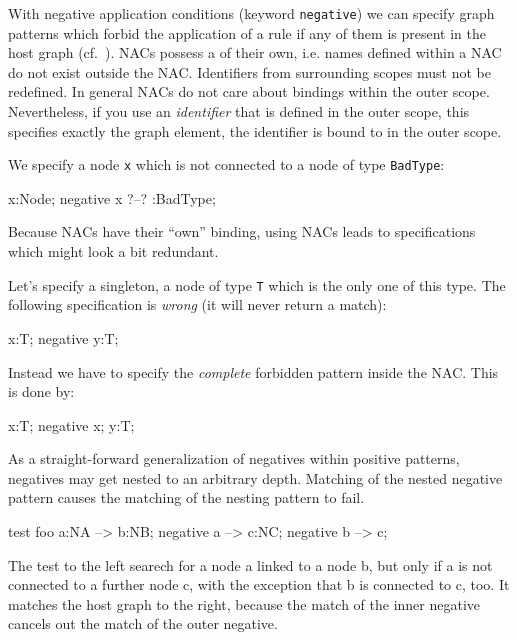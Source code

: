   With negative application conditions (keyword \texttt{negative}) we can specify graph patterns which forbid the application of a rule if any of them is present in the host graph (cf.~\cite{adam}). 
  NACs possess a  of their own, i.e. names defined within a NAC do not exist outside the NAC. 
  Identifiers from surrounding scopes must not be redefined.
  In general NACs do not care about bindings within the outer scope. 
   Nevertheless, if you use an \emph{identifier} that is defined in the outer scope, this specifies exactly the graph element, the identifier is bound to in the outer scope.
  \begin{example}
    We specify a node \texttt{x} which is not connected to a node of type \texttt{BadType}:
    \begin{grgen}
  x:Node;
  negative {
    x ?--? :BadType;
  }
    \end{grgen}
  \end{example}
   Because NACs have their ``own'' binding, using NACs leads to specifications which might look a bit redundant.
  \begin{example}
    Let's specify a singleton, a node of type \texttt{T} which is the only one of this type.
    The following specification is \emph{wrong} (it will never return a match):
    \begin{grgen}
  x:T;
  negative {
    y:T;
  }
    \end{grgen}
    Instead we have to specify the \emph{complete} forbidden pattern inside the NAC. This is done by:
     \begin{grgen}
  x:T;
  negative {
    x;
    y:T;
  }
    \end{grgen}
  \end{example} 

As a straight-forward generalization of negatives within positive patterns,
negatives may get nested to an arbitrary depth. Matching of the nested
negative pattern causes the matching of the nesting pattern to fail.

\begin{example}
  \begin{grgen}
test foo {
  a:NA --> b:NB;
  negative {
    a --> c:NC;
    negative {
      b --> c;
    }
  }
}
  \end{grgen}
\end{example}

The test to the left searech for a node a linked to a node b, but only if a is not connected to a further node c, with the exception that b is connected to c, too. It matches the host graph to the right, because the match of the inner negative cancels out the match of the outer negative.

